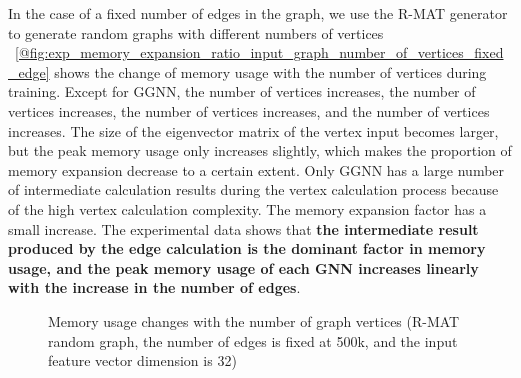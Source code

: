 In the case of a fixed number of edges in the graph, we use the R-MAT generator to generate random graphs with different numbers of vertices
\figurename~\ref{@fig:exp_memory_expansion_ratio_input_graph_number_of_vertices_fixed_edge} shows the change of memory usage with the number of vertices during training.
Except for GGNN, the number of vertices increases, the number of vertices increases, the number of vertices increases,
and the number of vertices increases. The size of the eigenvector matrix of the vertex input becomes larger, 
but the peak memory usage only increases slightly, which makes the proportion of memory expansion decrease to a certain extent. 
Only GGNN has a large number of intermediate calculation results during the vertex calculation process because of the high vertex calculation complexity. 
The memory expansion factor has a small increase. The experimental data shows that \textbf{the intermediate result produced by the edge calculation is the dominant factor
in memory usage, and the peak memory usage of each GNN increases linearly with the increase in the number of edges}.

\begin{figure}
    \centering
    \caption{Memory usage changes with the number of graph vertices (R-MAT random graph, the number of edges is fixed at 500k, and the input feature vector dimension is 32)}
    \label{fig:exp_memory_expansion_ratio_input_graph_number_of_vertices_fixed_edge}
\end{figure}

